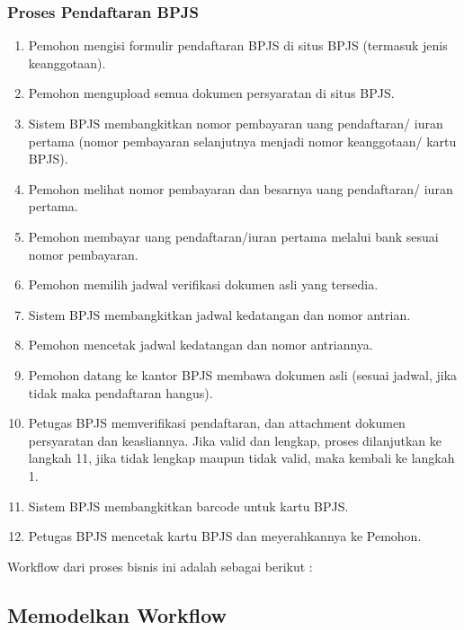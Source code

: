 \subsubsection{Proses Pendaftaran BPJS}
\begin{enumerate}
	\item Pemohon mengisi formulir pendaftaran BPJS di situs BPJS (termasuk jenis keanggotaan).
	\item Pemohon mengupload semua dokumen persyaratan di situs BPJS.
	\item Sistem BPJS membangkitkan nomor pembayaran uang pendaftaran/ iuran pertama (nomor pembayaran selanjutnya menjadi nomor keanggotaan/ kartu BPJS).
  \item Pemohon melihat nomor pembayaran dan besarnya uang pendaftaran/ iuran pertama.
  \item Pemohon membayar uang pendaftaran/iuran pertama melalui bank sesuai nomor pembayaran.
  \item Pemohon memilih jadwal verifikasi dokumen asli yang tersedia.
  \item Sistem BPJS membangkitkan jadwal kedatangan dan nomor antrian.
  \item Pemohon mencetak jadwal kedatangan dan nomor antriannya.
  \item Pemohon datang ke kantor BPJS membawa dokumen asli (sesuai jadwal, jika tidak maka pendaftaran hangus). 
  \item Petugas BPJS memverifikasi pendaftaran, dan attachment dokumen persyaratan dan keasliannya. Jika valid dan lengkap, proses dilanjutkan ke langkah 11, jika tidak lengkap maupun tidak valid, maka kembali ke langkah 1.
	\item Sistem BPJS membangkitkan barcode untuk kartu BPJS.
  \item Petugas BPJS mencetak kartu BPJS dan meyerahkannya ke Pemohon.
\end{enumerate}
Workflow dari proses bisnis ini adalah sebagai berikut :
		
		


\subsection{Memodelkan Workflow}
\label{hasilstudi_workflow}
